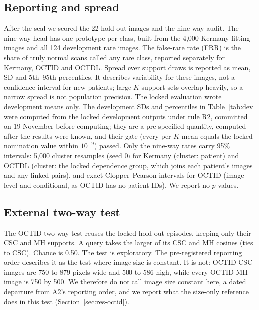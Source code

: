 \documentclass[conference]{IEEEtran}
\begin{document}
\subsection{Reporting and spread}
After the seal we scored the 22 hold-out images and the nine-way audit. The nine-way head has one prototype per class, built from the 4,000 Kermany fitting images and all 124 development rare images. The false-rare rate (FRR) is the share of truly normal scans called any rare class, reported separately for Kermany, OCTID and OCTDL.
Spread over support draws is reported as mean, SD and 5th--95th percentiles. It describes variability for these images, not a confidence interval for new patients; large-$K$ support sets overlap heavily, so a narrow spread is not population precision. The locked evaluation wrote development means only. The development SDs and percentiles in Table~\ref{tab:dev} were computed from the locked development outputs under rule R2, committed on 19 November before computing; they are a pre-specified quantity, computed after the results were known, and their gate (every per-$K$ mean equals the locked nomination value within $10^{-9}$) passed.
Only the nine-way rates carry 95\% intervals: 5,000 cluster resamples (seed 0) for Kermany (cluster: patient) and OCTDL (cluster: the locked dependence group, which joins each patient's images and any linked pairs), and exact Clopper--Pearson intervals for OCTID (image-level and conditional, as OCTID has no patient IDs). We report no $p$-values.

\subsection{External two-way test}
The OCTID two-way test reuses the locked hold-out episodes, keeping only their CSC and MH supports. A query takes the larger of its CSC and MH cosines (ties to CSC). Chance is 0.50. The test is exploratory. The pre-registered reporting order describes it as the test where image size is constant. It is not: OCTID CSC images are 750 to 879 pixels wide and 500 to 586 high, while every OCTID MH image is 750 by 500. We therefore do not call image size constant here, a dated departure from A2's reporting order, and we report what the size-only reference does in this test (Section~\ref{sec:res-octid}).
\end{document}
